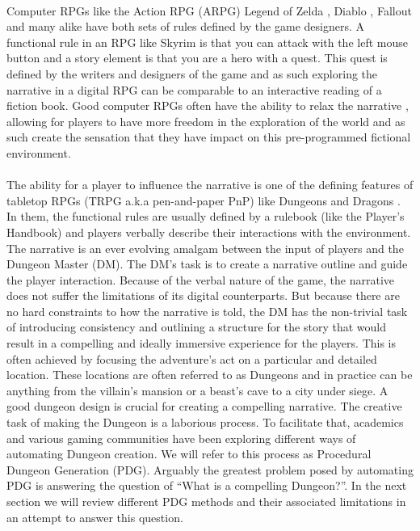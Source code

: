 \documentclass{UoYCSproject}
\begin{document}
\paragraph{}
Computer RPGs like the Action RPG (ARPG) Legend of Zelda \parencite{game:LoZ}, Diablo \parencite{game:Diablo}, Fallout \parencite{game:Fallout} and many alike have both sets of rules defined by the game designers. A functional rule in an RPG like Skyrim \parencite{game:Skyrim} is that you can attack with the left mouse button and a story element is that you are a hero with a quest. This quest is defined by the writers and designers of the game and as such exploring the narrative in a digital RPG can be comparable to an interactive reading of a fiction book. Good computer RPGs often have the ability to relax the narrative \parencite{TychsenGM}, allowing for players to have more freedom in the exploration of the world and as such create the sensation that they have impact on this pre-programmed fictional environment.

\paragraph{}
The ability for a player to influence the narrative is one of the defining features of tabletop RPGs (TRPG a.k.a pen-and-paper PnP) like Dungeons and Dragons \parencite{DnD}. In them, the functional rules are usually defined by a rulebook (like the Player’s Handbook) and players verbally describe their interactions with the environment. The narrative is an ever evolving amalgam between the input of players and the Dungeon Master (DM). The DM’s task is to create a narrative outline and guide the player interaction. Because of the verbal nature of the game, the narrative does not suffer the limitations of its digital counterparts. But because there are no hard constraints to how the narrative is told, the DM has the non-trivial task of introducing consistency and outlining a structure for the story that would result in a compelling and ideally immersive experience for the players. This is often achieved by focusing the adventure’s act on a particular and detailed location. These locations are often referred to as Dungeons and in practice can be anything from the villain's mansion or a beast’s cave to a city under siege. A good dungeon design is crucial for creating a compelling narrative. The creative task of making the Dungeon is a laborious process. To facilitate that, academics and various gaming communities have been exploring different ways of automating Dungeon creation. We will refer to this process as Procedural Dungeon Generation (PDG). Arguably the greatest problem posed by automating PDG is answering the question of “What is a compelling Dungeon?”. In the next section we will review different PDG methods and their associated limitations in an attempt to answer this question.
\end{document}
